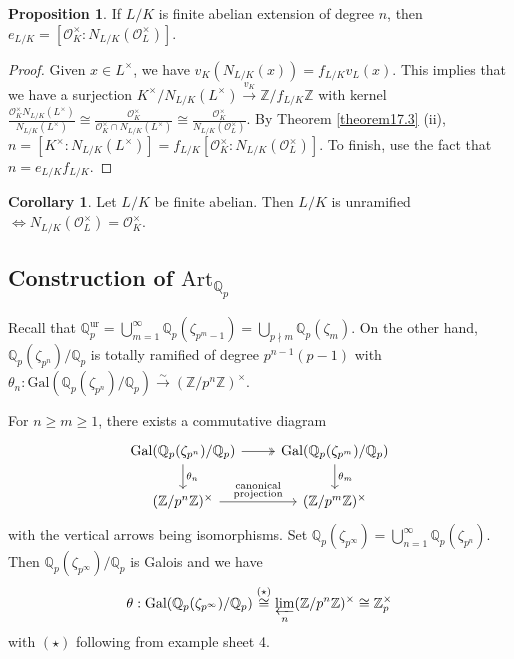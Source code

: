 \documentclass{article}
\theoremstyle{definition}
\newtheorem{cor}[theorem]{Corollary}
\newtheorem{prop}[theorem]{Proposition}
\begin{document}
\begin{prop}
    If $L/K$ is finite abelian extension of degree $n$, then $e_{L/K} = [\mathcal{O}_K^\times : N_{L/K}(\mathcal{O}_L^\times)]$.
\end{prop}
\begin{proof}
    Given $x \in L^\times$, we have $v_K(N_{L/K}(x)) = f_{L/K}v_L(x)$. This implies that we have a surjection $K^\times/N_{L/K}(L^\times) \stackrel{v_K}{\to} \mathbb{Z}/f_{L/K}\mathbb{Z}$ with kernel $\frac{\mathcal{O}_K^\times N_{L/K}(L^\times)}{N_{L/K}(L^\times)} \cong \frac{\mathcal{O}_K^\times}{\mathcal{O}_K^\times \cap N_{L/K}(L^\times)} \cong \frac{\mathcal{O}_K^\times}{N_{L/K}(\mathcal{O}_L^\times)}$. By Theorem \ref{theorem17.3} (ii), $n = [K^\times : N_{L/K}(L^\times)] = f_{L/K} [\mathcal{O}_K^\times : N_{L/K}(\mathcal{O}_L^\times)]$. To finish, use the fact that $n = e_{L/K}f_{L/K}$.
\end{proof}
\begin{cor}
    Let $L/K$ be finite abelian. Then $L/K$ is unramified $\iff N_{L/K}(\mathcal{O}_L^\times) = \mathcal{O}_K^\times$. 
\end{cor}
\subsection{Construction of $\text{Art}_{\mathbb{Q}_p}$}
Recall that $\mathbb{Q}_p^{\text{ur}} = \bigcup_{m=1}^{\infty} \mathbb{Q}_p(\zeta_{p^m-1}) = \bigcup_{p \nmid m} \mathbb{Q}_{p}(\zeta_{m})$. On the other hand, $\mathbb{Q}_p(\zeta_{p^n})/\mathbb{Q}_p$ is totally ramified of degree $p^{n-1}(p-1)$ with $\theta_n : \text{Gal}(\mathbb{Q}_p(\zeta_{p^n})/\mathbb{Q}_p) \stackrel{\sim}{\to} (\mathbb{Z}/p^n\mathbb{Z})^\times$.
\vspace{1mm}
 
For $n\ge m\ge 1$, there exists a commutative diagram $$\begin{tikzcd}
    \text{Gal}(\mathbb{Q}_p(\zeta_{p^n})/\mathbb{Q}_p) & \text{Gal}(\mathbb{Q}_p    (\zeta_{p^m})/\mathbb{Q}_p)\\
    (\mathbb{Z}/p^n \mathbb{Z})^\times & (\mathbb{Z}/p^m \mathbb{Z})^\times
    \arrow["\theta_n", from=1-1, to=2-1]
    \arrow["", from=1-1, to=1-2, two heads]
    \arrow["\substack{\text{canonical}\\\text{projection}}", from=2-1, to=2-2]
    \arrow["\theta_m", from=1-2, to=2-2]
\end{tikzcd}$$
with the vertical arrows being isomorphisms. Set $\mathbb{Q}_p(\zeta_{p^\infty}) = \bigcup_{n=1}^\infty \mathbb{Q}_p(\zeta_{p^n})$. Then $\mathbb{Q}_p(\zeta_{p^{\infty}})/\mathbb{Q}_p$ is Galois and we have 
\begin{align*}
    \theta : \text{Gal}(\mathbb{Q}_p(\zeta_{p^{\infty}})/\mathbb{Q}_p) \stackrel{(\star)}{\cong} \underset{n}{\varprojlim} (\mathbb{Z}/p^n \mathbb{Z})^\times \cong \mathbb{Z}_p^\times
\end{align*}
with $(\star)$ following from example sheet 4.
\vspace{1mm}
 
\end{document}
